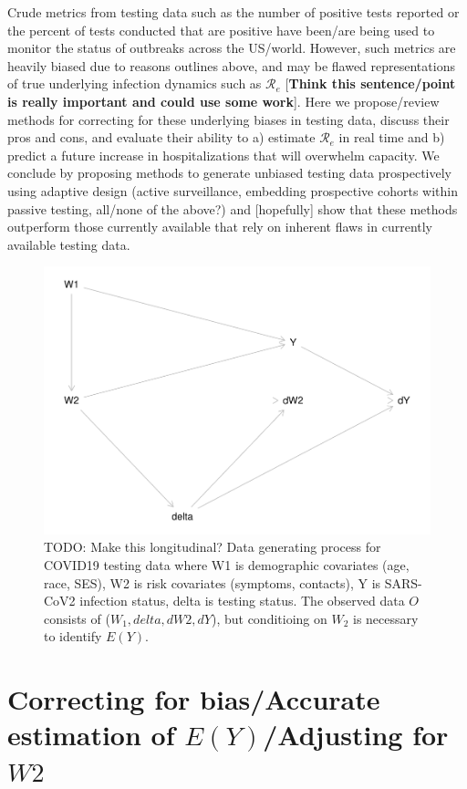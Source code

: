 \documentclass[]{article}
\begin{document}
Crude metrics from testing data such as the number of positive tests
reported or the percent of tests conducted that are positive have
been/are being used to monitor the status of outbreaks across the
US/world. However, such metrics are heavily biased due to reasons
outlines above, and may be flawed representations of true underlying
infection dynamics such as \(\mathcal{R}_e\) {[}\textbf{Think this
sentence/point is really important and could use some work}{]}. Here we
propose/review methods for correcting for these underlying biases in
testing data, discuss their pros and cons, and evaluate their ability to
a) estimate \(\mathcal{R}_e\) in real time and b) predict a future
increase in hospitalizations that will overwhelm capacity. We conclude
by proposing methods to generate unbiased testing data prospectively
using adaptive design (active surveillance, embedding prospective
cohorts within passive testing, all/none of the above?) and
{[}hopefully{]} show that these methods outperform those currently
available that rely on inherent flaws in currently available testing
data.

\begin{figure}
\centering
\includegraphics{Testing_Writeup_files/figure-latex/dag-1.pdf}
\caption{TODO: Make this longitudinal? Data generating process for
COVID19 testing data where W1 is demographic covariates (age, race,
SES), W2 is risk covariates (symptoms, contacts), Y is SARS-CoV2
infection status, delta is testing status. The observed data \(O\)
consists of (\(W_1, delta, dW2, dY\)), but conditioing on \(W_2\) is
necessary to identify \(E(Y)\).}
\end{figure}

\hypertarget{correcting-for-biasaccurate-estimation-of-eyadjusting-for-w2}{%
\section{\texorpdfstring{Correcting for bias/Accurate estimation of
\(E(Y)\)/Adjusting for
\(W2\)}{Correcting for bias/Accurate estimation of E(Y)/Adjusting for W2}}\label{correcting-for-biasaccurate-estimation-of-eyadjusting-for-w2}}
\end{document}

